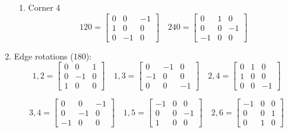 \documentclass{article}
\begin{document}
\begin{enumerate}
\begin{enumerate}
\item Corner 4\\
\begin{equation*}
120 = \begin{bmatrix}
0 & 0 & -1\\
1 & 0 & 0\\
0 & -1 & 0
\end{bmatrix}
\quad
240 = \begin{bmatrix}
0 & 1 & 0\\
0 & 0 & -1\\
-1 & 0 & 0
\end{bmatrix}
\end{equation*}

\end{enumerate}

\item Edge rotations (180\degree):\\
\begin{equation*}
1,2 = \begin{bmatrix}
0 & 0 & 1\\
0 & -1 & 0\\
1 & 0 & 0
\end{bmatrix}
\quad
1,3 = \begin{bmatrix}
0 & -1 & 0\\
-1 & 0 & 0\\
0 & 0 & -1
\end{bmatrix}
\quad
2,4 = \begin{bmatrix}
0 & 1 & 0\\
1 & 0 & 0\\
0 & 0 & -1
\end{bmatrix}
\end{equation*}

\begin{equation*}
3,4 = \begin{bmatrix}
0 & 0 & -1\\
0 & -1 & 0\\
-1 & 0 & 0
\end{bmatrix}
\quad
1,5 = \begin{bmatrix}
-1 & 0 & 0\\
0 & 0 & -1\\
1 & 0 & 0
\end{bmatrix}
\quad
2,6 = \begin{bmatrix}
-1 & 0 & 0\\
0 & 0 & 1\\
0 & 1 & 0
\end{bmatrix}
\end{equation*}

\end{enumerate}
\end{document}
